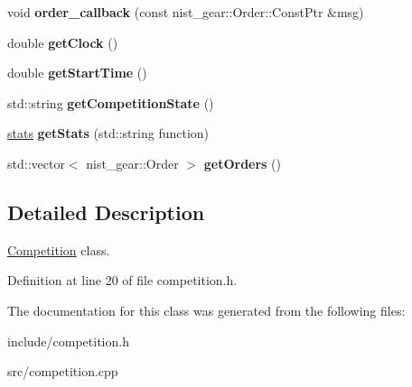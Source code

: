\begin{DoxyCompactItemize}
\mbox{\label{classCompetition_a6f51ab2e5a0da50fc53035f3ff6c9c31}} 
void {\bfseries order\+\_\+callback} (const nist\+\_\+gear\+::\+Order\+::\+Const\+Ptr \&msg)
\item 
\mbox{\label{classCompetition_a4ea6b45be32e5b0e1f8e72fc053c4550}} 
double {\bfseries get\+Clock} ()
\item 
\mbox{\label{classCompetition_a9c8b79a8c4a7bcc5eaa77a327df3f98a}} 
double {\bfseries get\+Start\+Time} ()
\item 
\mbox{\label{classCompetition_a3c553faa38b1bc1fa6efa049c8e23735}} 
std\+::string {\bfseries get\+Competition\+State} ()
\item 
\mbox{\label{classCompetition_acb4ec20a6365fbb922bd20fc3509ddf8}} 
\hyperlink{structStats}{stats} {\bfseries get\+Stats} (std\+::string function)
\item 
\mbox{\label{classCompetition_a34446150f76fce624cef52b1ad26ef02}} 
std\+::vector$<$ nist\+\_\+gear\+::\+Order $>$ {\bfseries get\+Orders} ()
\end{DoxyCompactItemize}


\subsection{Detailed Description}
\hyperlink{classCompetition}{Competition} class. 

Definition at line 20 of file competition.\+h.



The documentation for this class was generated from the following files\+:\begin{DoxyCompactItemize}
\item 
include/competition.\+h\item 
src/competition.\+cpp\end{DoxyCompactItemize}

